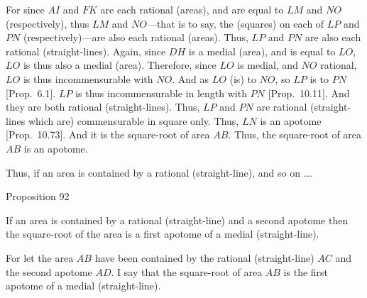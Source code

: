 For since $AI$ and $FK$ are each rational (areas), and are equal to
$LM$ and $NO$ (respectively), thus  $LM$ and $NO$---that is to say, the
(squares) on each of $LP$ and $PN$ (respectively)---are  also
each rational (areas). Thus, $LP$ and $PN$ are also each rational (straight-lines). 
Again, since $DH$ is a medial (area), and is equal to $LO$, $LO$ is thus
also a medial (area). Therefore, since $LO$ is medial, and $NO$ rational, 
$LO$ is thus incommensurable with $NO$. And as $LO$ (is) to $NO$,
so $LP$ is to $PN$ [Prop.~6.1]. $LP$ is
thus incommensurable in length with $PN$ [Prop.~10.11]. And they are both rational
(straight-lines). Thus, $LP$ and $PN$ are rational (straight-lines which are)
commensurable in square only. Thus, $LN$ is an apotome [Prop.~10.73]. And it is the square-root of area $AB$. Thus, the square-root of area $AB$ is an apotome.

Thus, if an area is contained by a rational (straight-line), and
so on \ldots.


\begin{center}
{\large Proposition 92}
\end{center}

If an area is contained by a rational (straight-line)
and a second apotome then the square-root of the area is a first apotome of a medial (straight-line).

\epsfysize=1.3in
\centerline{}

For let the area $AB$ have been contained by the rational (straight-line) $AC$ and the second apotome $AD$. I say that the square-root of area $AB$ is the first apotome of a medial (straight-line).

